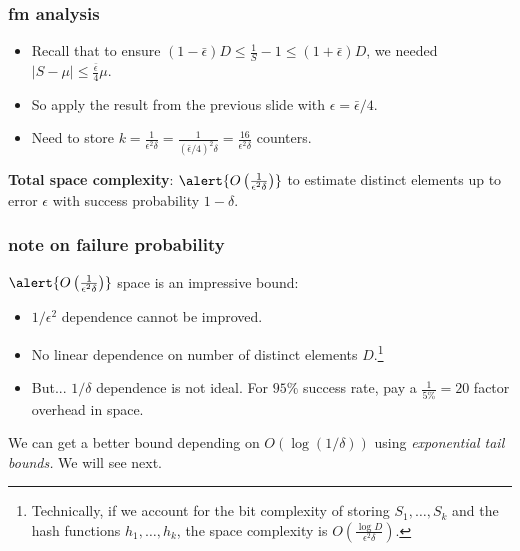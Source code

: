 \documentclass[compress]{beamer}
\begin{document}
\begin{frame}[t]
	\frametitle{fm analysis}
	\begin{itemize}
		\item Recall that to ensure $(1-\bar{\epsilon}) D \leq \frac{1}{S} - 1 \leq (1+\bar{\epsilon}) D$, we needed  $|S - \mu| \leq \frac{\bar{\epsilon}}{4} \mu$. 
		\item So apply the result from the previous slide with $\epsilon = \bar{\epsilon}/4$. 
		\item Need to store $k = \frac{1}{\epsilon^2\delta} = \frac{1}{(\bar{\epsilon}/4)^2\delta} = \frac{16}{\epsilon^2\delta}$ counters.
	\end{itemize}

	\textbf{Total space complexity}: $\alert{O\left(\frac{1}{\epsilon^2\delta}\right)}$ to estimate distinct elements up to error $\epsilon$ with success probability $1-\delta$.
\end{frame}

\begin{frame}
	\frametitle{note on failure probability}
	$\alert{O\left(\frac{1}{\epsilon^2\delta}\right)}$ space is an impressive bound:
	\begin{itemize}
		\item $1/\epsilon^2$ dependence cannot be improved.
		\item No linear dependence on number of distinct elements $D$.\footnote{Technically, if we account for the bit complexity of storing $S_1, \ldots, S_k$ and the hash functions $h_1, \ldots, h_k$, the space complexity is $O\left(\frac{\log D}{\epsilon^2\delta}\right)$.}
		\item But... $1/\delta$ dependence is not ideal. For $95\%$ success rate, pay a $\frac{1}{5\%} = 20$ factor overhead in space. 
	\end{itemize}
We can get a better bound depending on $O(\log(1/\delta))$ using \emph{exponential tail bounds.} We will see next.
\end{frame}
\end{document}
